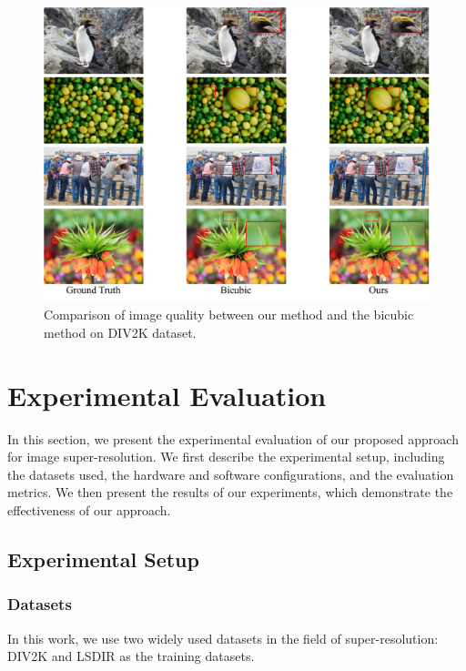 \documentclass[10pt,twocolumn,letterpaper]{article}
\begin{document}
\begin{figure}[t]
    \begin{center}
    \includegraphics[width=\textwidth]{../x4result.pdf}
    \end{center}
    \caption{Comparison of image quality between our method and the bicubic method on DIV2K dataset.}
    \label{fig:result}
\end{figure}

\section{Experimental Evaluation}
\label{sec:exp}
In this section, we present the experimental evaluation of our proposed approach for image super-resolution. We first describe the experimental setup, including the datasets used, the hardware and software configurations, and the evaluation metrics. We then present the results of our experiments, which demonstrate the effectiveness of our approach.

\subsection{Experimental Setup}

\subsubsection{Datasets}
In this work, we use two widely used datasets in the field of super-resolution: DIV2K\cite{div2k} and LSDIR\cite{lilsdir} as the training datasets.
\end{document}
